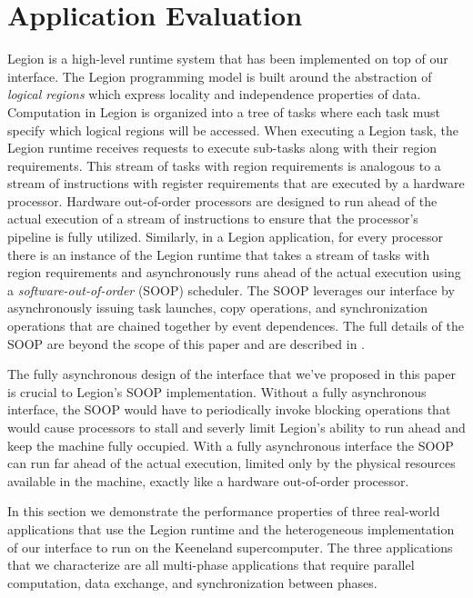 
\section{Application Evaluation}
\label{sec:apps}
Legion is a high-level runtime system that has been implemented on top
of our interface\cite{Legion12}.  
The Legion programming model is built around the abstraction of 
{\em logical regions} which express locality and independence properties 
of data.  Computation in Legion is organized into a tree of tasks where 
each task must specify which logical regions will be accessed.
When executing a Legion task, the Legion runtime receives requests
to execute sub-tasks along with their region requirements.
This stream of tasks with region requirements is analogous to a stream
of instructions with register requirements that are executed by 
a hardware processor.  Hardware out-of-order processors are designed to
run ahead of the actual execution of a stream of instructions
to ensure that the processor's pipeline is fully utilized.  Similarly, in a
Legion application, for every processor there is an instance of the Legion runtime
that takes a stream of tasks with region requirements and asynchronously
runs ahead of the actual execution using a {\em software-out-of-order} (SOOP)
scheduler.  The SOOP leverages our interface by asynchronously issuing task launches, copy
operations, and synchronization operations that are chained together by
event dependences.  The full details of the SOOP are beyond the scope of this paper
and are described in \cite{Legion12}.

The fully asynchronous design of the interface that we've proposed in
this paper is crucial to Legion's SOOP implementation.  Without a fully
asynchronous interface, the SOOP would have to periodically invoke
blocking operations that would cause processors to stall and severly
limit Legion's ability to run ahead and keep the machine fully
occupied.  With a fully asynchronous interface the SOOP can run
far ahead of the actual execution, limited only by the physical resources
available in the machine, exactly like a hardware out-of-order processor.

In this section we demonstrate the performance properties of three
real-world applications that use the Legion runtime and the heterogeneous
implementation of our interface to run on the Keeneland supercomputer.
The three applications that we characterize are all multi-phase
applications that require parallel computation, data exchange, and
synchronization between phases. 

